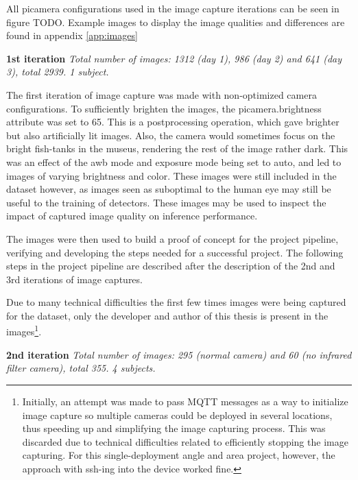 All picamera configurations used in the image capture iterations can be seen in figure TODO. Example images to display the image qualities and differences are found in appendix \ref{app:images}

\textbf{1st iteration}
\textit{Total number of images: 1312 (day 1), 986 (day 2) and 641 (day 3), total 2939. 1 subject.}

The first iteration of image capture was made with non-optimized camera configurations. To sufficiently brighten the images, the picamera.brightness attribute was set to 65. This is a postprocessing operation, which gave brighter but also artificially lit images. Also, the camera would sometimes focus on the bright fish-tanks in the museus, rendering the rest of the image rather dark. This was an effect of the awb mode and exposure mode being set to auto, and led to images of varying brightness and color. These images were still included in the dataset however, as images seen as suboptimal to the human eye may still be useful to the training of detectors. These images may be used to inspect the impact of captured image quality on inference performance. 

The images were then used to build a proof of concept for the project pipeline, verifying and developing the steps needed for a successful project. The following steps in the project pipeline are described after the description of the 2nd and 3rd iterations of image captures. 

Due to many technical difficulties the first few times images were being captured for the dataset, only the developer and author of this thesis is present in the images\footnote{Initially, an attempt was made to pass MQTT messages as a way to initialize image capture so multiple cameras could be deployed in several locations, thus speeding up and simplifying the image capturing process. This was discarded due to technical difficulties related to efficiently stopping the image capturing. For this single-deployment angle and area project, however, the approach with ssh-ing into the device worked fine.}. 

\textbf{2nd iteration}
\textit{Total number of images: 295 (normal camera) and 60 (no infrared filter camera), total 355. 4 subjects.}


